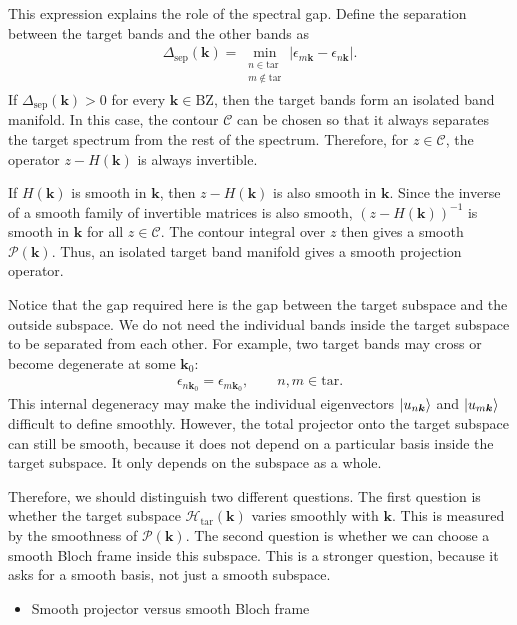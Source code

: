 \documentclass[12pt, oneside]{article}
\newcommand{\mr}[1]{\mathrm{#1}}
\newcommand{\p}[1]{\left(#1\right)}
\numberwithin{equation}{subsection}
\begin{document}
This expression explains the role of the spectral gap. Define the separation between the target bands and the other bands as
\begin{align}
	\Delta_{\mr{sep}}\p{\bm{k}}=\min_{\substack{n\in\mr{tar}\\m\notin\mr{tar}}}\left|\epsilon_{m\bm{k}}-\epsilon_{n\bm{k}}\right|.
\end{align}
If \(\Delta_{\mr{sep}}\p{\bm{k}}>0\) for every \(\bm{k}\in\mr{BZ}\), then the target bands form an isolated band manifold. In this case, the contour \(\mathcal{C}\) can be chosen so that it always separates the target spectrum from the rest of the spectrum. Therefore, for \(z\in\mathcal{C}\), the operator \(z-H\p{\bm{k}}\) is always invertible.

If \(H\p{\bm{k}}\) is smooth in \(\bm{k}\), then \(z-H\p{\bm{k}}\) is also smooth in \(\bm{k}\). Since the inverse of a smooth family of invertible matrices is also smooth, \(\p{z-H\p{\bm{k}}}^{-1}\) is smooth in \(\bm{k}\) for all \(z\in\mathcal{C}\). The contour integral over \(z\) then gives a smooth \(\mathcal{P}\p{\bm{k}}\). Thus, an isolated target band manifold gives a smooth projection operator.

Notice that the gap required here is the gap between the target subspace and the outside subspace. We do not need the individual bands inside the target subspace to be separated from each other. For example, two target bands may cross or become degenerate at some \(\bm{k}_0\):
\begin{align}
	\epsilon_{n\bm{k}_0}=\epsilon_{m\bm{k}_0},\qquad n,m\in\mr{tar}.
\end{align}
This internal degeneracy may make the individual eigenvectors \(\ket{u_{n\bm{k}}}\) and \(\ket{u_{m\bm{k}}}\) difficult to define smoothly. However, the total projector onto the target subspace can still be smooth, because it does not depend on a particular basis inside the target subspace. It only depends on the subspace as a whole.

Therefore, we should distinguish two different questions. The first question is whether the target subspace \(\mathcal{H}_{\mr{tar}}\p{\bm{k}}\) varies smoothly with \(\bm{k}\). This is measured by the smoothness of \(\mathcal{P}\p{\bm{k}}\). The second question is whether we can choose a smooth Bloch frame inside this subspace. This is a stronger question, because it asks for a smooth basis, not just a smooth subspace.

\begin{itemize}
	\item Smooth projector versus smooth Bloch frame
\end{itemize}
\end{document}
